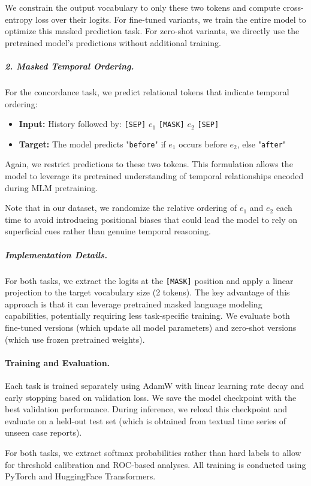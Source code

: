 We constrain the output vocabulary to only these two tokens and compute cross-entropy loss over their logits. For fine-tuned variants, we train the entire model to optimize this masked prediction task. For zero-shot variants, we directly use the pretrained model's predictions without additional training.

\subparagraph{2. Masked Temporal Ordering.}
For the concordance task, we predict relational tokens that indicate temporal ordering:

\begin{itemize}
    \item \textbf{Input:} History followed by: \texttt{[SEP]} $e_1$ \texttt{[MASK]} $e_2$ \texttt{[SEP]}
    \item \textbf{Target:} The model predicts "\texttt{before}" if $e_1$ occurs before $e_2$, else "\texttt{after}"
\end{itemize}

Again, we restrict predictions to these two tokens. This formulation allows the model to leverage its pretrained understanding of temporal relationships encoded during MLM pretraining. 

Note that in our dataset, we randomize the relative ordering of $e_1$ and $e_2$ each time to avoid introducing positional biases that could lead the model to rely on superficial cues rather than genuine temporal reasoning.

\subparagraph{Implementation Details.}
For both tasks, we extract the logits at the \texttt{[MASK]} position and apply a linear projection to the target vocabulary size (2 tokens). The key advantage of this approach is that it can leverage pretrained masked language modeling capabilities, potentially requiring less task-specific training. We evaluate both fine-tuned versions (which update all model parameters) and zero-shot versions (which use frozen pretrained weights).

\paragraph{Training and Evaluation.}
Each task is trained separately using AdamW with linear learning rate decay and early stopping based on validation loss. 
We save the model checkpoint with the best validation performance. 
During inference, we reload this checkpoint and evaluate on a held-out test set (which is obtained from textual time series of unseen case reports).

For both tasks, we extract softmax probabilities rather than hard labels to allow for threshold calibration and ROC-based analyses. 
All training is conducted using PyTorch and HuggingFace Transformers.
\clearpage
